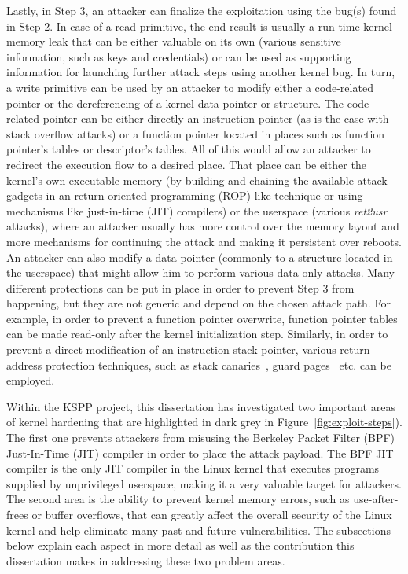 Lastly, in Step 3, an attacker can finalize the exploitation using the bug(s) found in Step 2. In case of a read primitive, the end result is usually a run-time kernel memory leak that can be either valuable on its own (various sensitive information, such as keys and credentials) or can be used as supporting information for launching further attack steps using another kernel bug. In turn, a write primitive can be used by an attacker to modify either a code-related pointer or the dereferencing of a kernel data pointer or structure. The code-related pointer can be either directly an instruction pointer (as is the case with stack overflow attacks) or a function pointer located in places such as function pointer's tables or descriptor's tables. All of this would allow an attacker to redirect the execution flow to a desired place. That place can be either the kernel's own executable memory (by building and chaining the available attack gadgets in an return-oriented programming (ROP)-like technique or using mechanisms like just-in-time (JIT) compilers) or the userspace (various \textit{ret2usr} attacks), where an attacker usually has more control over the memory layout and more mechanisms for continuing the attack and making it persistent over reboots. An attacker can also modify a data pointer (commonly to a structure located in the userspace) that might allow him to perform various data-only attacks. Many different protections can be put in place in order to prevent Step 3 from happening, but they are not generic and depend on the chosen attack path. For example, in order to prevent a function pointer overwrite, function pointer tables can be made read-only after the kernel initialization step. Similarly, in order to prevent a direct modification of an instruction stack pointer, various return address protection techniques, such as stack canaries~\cite{edge2014}, guard pages~\cite{kstackoverflow2017} etc. can be employed.    

Within the KSPP project, this dissertation has investigated two important areas of kernel hardening that are highlighted in dark grey in Figure~\ref{fig:exploit-steps}). The first one prevents attackers from misusing the Berkeley Packet Filter (BPF) Just-In-Time (JIT) compiler in order to place the attack payload. The BPF JIT compiler is the only JIT compiler in the Linux kernel that executes programs supplied by unprivileged userspace, making it a very valuable target for attackers.  The second area is the ability to prevent kernel memory errors, such as use-after-frees or buffer overflows, that can greatly affect the overall security of the Linux kernel and help eliminate many past and future vulnerabilities. The subsections below explain each aspect in more detail as well as the contribution this dissertation makes in addressing these two problem areas.  


